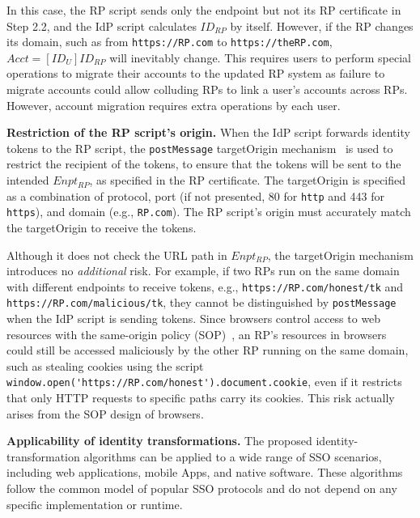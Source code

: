 In this case, the RP script sends only the endpoint but not its RP certificate in Step 2.2, and the IdP script calculates $ID_{RP}$ by itself. %
However, if the RP changes its domain, such as from \verb+https://RP.com+ to \verb+https://theRP.com+,
$Acct = [ID_U]ID_{RP}$ will inevitably change.
This requires users to perform special operations to migrate their accounts to the updated RP system as failure to migrate accounts could allow colluding RPs to link a user's accounts across RPs. However, account migration requires extra operations by each user.

\noindent \textbf{Restriction of the RP script's origin.}
When the IdP script forwards identity tokens to the RP script, the \verb+postMessage+ targetOrigin mechanism~\cite{postm-targeto} is used to restrict the recipient of the tokens, to ensure that the tokens will be sent to the intended $Enpt_{RP}$, as specified in the RP certificate. The targetOrigin is specified as a combination of protocol, port (if not presented, 80 for \verb+http+ and 443 for \verb+https+), and domain (e.g., \verb+RP.com+).
The RP script's origin must accurately match the targetOrigin to receive the tokens.

Although it does not check the URL path in $Enpt_{RP}$,
the targetOrigin mechanism introduces no {\em additional} risk.
For example, if two RPs run on the same domain with different endpoints to receive tokens,
 e.g., \verb+https://RP.com/honest/tk+ and \verb+https://RP.com/malicious/tk+,
  they cannot be distinguished by \verb+postMessage+ when the IdP script is sending tokens.
Since browsers control access to web resources with the same-origin policy (SOP)~\cite{sop},
   an RP's resources in browsers could still be accessed maliciously by the other RP running on the same domain,
    such as stealing cookies using the script \verb+window.open('https://RP.com/honest').document.cookie+,
even if it restricts that only HTTP requests to specific paths carry its cookies.
 This risk actually arises from the SOP design of browsers. %



\noindent \textbf{Applicability of identity transformations.}
The proposed identity-transformation algorithms %
can be applied to a wide range of SSO scenarios, including web applications, mobile Apps, and native software.
These algorithms follow the common model of popular SSO protocols and do not depend on any specific implementation or runtime.%



